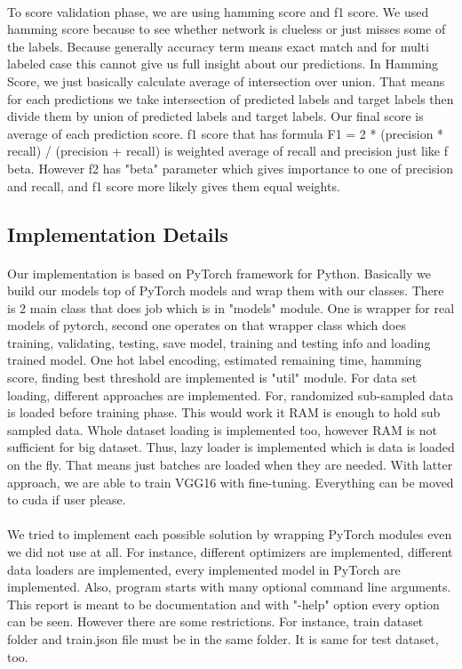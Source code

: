 \documentclass[12pt]{article}
\begin{document}
\paragraph{}To score validation phase, we are using hamming score and f1 score. We used hamming score because to see whether network is clueless or just misses some of the labels. Because generally accuracy term means exact match and for multi labeled case this cannot give us full insight about our predictions. In Hamming Score, we just basically calculate average of intersection over union. That means for each predictions we take intersection of predicted labels and target labels then divide them by union of predicted labels and target labels. Our final score is average of each prediction score. f1 score that has formula F1 = 2 * (precision * recall) / (precision + recall) is weighted average of recall and precision just like f beta. However f2 has "beta" parameter which gives importance to one of precision and recall, and f1 score more likely gives them equal weights. 
\subsection{Implementation Details}
\paragraph{}Our implementation is based on PyTorch framework for Python. Basically we build our models top of PyTorch models and wrap them with our classes. There is 2 main class that does job which is in "models" module. One is wrapper for real models of pytorch, second one operates on that wrapper class which does training, validating, testing, save model, training and testing info and loading trained model. One hot label encoding, estimated remaining time, hamming score, finding best threshold are implemented is "util" module. For data set loading, different approaches are implemented. For, randomized sub-sampled data is loaded before training phase. This would work it RAM is enough to hold sub sampled data. Whole dataset loading is implemented too, however RAM is not sufficient for big dataset. Thus, lazy loader is implemented which is data is loaded on the fly. That means just batches are loaded when they are needed. With latter approach, we are able to train VGG16 with fine-tuning. Everything can be moved to cuda if user please.
\paragraph{} We tried to implement each possible solution by wrapping PyTorch modules even we did not use at all. For instance, different optimizers are implemented, different data loaders are implemented, every implemented model in PyTorch are implemented. Also, program starts with many optional command line arguments. This report is meant to be documentation and with "-help" option every option can be seen. However there are some restrictions. For instance, train dataset folder and train.json file must be in the same folder. It is same for test dataset, too. 
\end{document}
